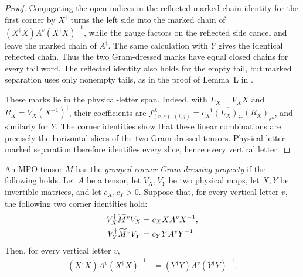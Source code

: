 \begin{proof}
    \leanok
    Conjugating the open indices in the reflected marked-chain identity for
    the first corner by $X^\dagger$ turns the left side into the marked chain
    of $(X^\dagger X)A^v(X^\dagger X)^{-1}$, while the gauge factors on the
    reflected side cancel and leave the marked chain of $A^\sharp$. The
    same calculation with $Y$ gives the identical reflected chain. Thus the
    two Gram-dressed marks have equal closed chains for every tail word. The
    reflected identity also holds for the empty tail, but marked separation
    uses only nonempty tails, as in the proof of Lemma~L in
    \cite[Appendix~C.3, lines~1848--1858]{Cirac2016MPDO_arXiv}.

    These marks lie in the physical-letter span. Indeed, with
    $L_X=V_XX$ and $R_X=V_X(X^{-1})^\dagger$, their coefficients are
    $f^X_{(r,s),(i,j)}
        =c_X^{-1}\overline{(L_X)_{ir}}(R_X)_{js}$, and similarly for $Y$.
    The corner identities show that these linear combinations are precisely
    the horizontal slices of the two Gram-dressed tensors. Physical-letter
    marked separation therefore identifies every slice, hence every vertical
    letter.
\end{proof}

\begin{definition}
    \label{def:grouped_corner_gram_dressing}
    \leanok
    An MPO tensor $M$ has the \emph{grouped-corner Gram-dressing property} if
    the following holds. Let $A$ be a tensor, let $V_X,V_Y$ be two physical
    maps, let $X,Y$ be invertible matrices, and let $c_X,c_Y>0$. Suppose that,
    for every vertical letter $v$, the following two corner identities hold:
    \begin{align}
        V_X^\dagger\widetilde M^vV_X
         & =c_X X A^vX^{-1},
        \notag               \\
        V_Y^\dagger\widetilde M^vV_Y
         & =c_Y Y A^vY^{-1}
        \notag
    \end{align}
    Then, for every vertical letter $v$,
    \begin{align}
        (X^\dagger X)A^v(X^\dagger X)^{-1}
         & =(Y^\dagger Y)A^v(Y^\dagger Y)^{-1}.
        \label{eq:grouped_corner_gram_dressing}
    \end{align}
\end{definition}

